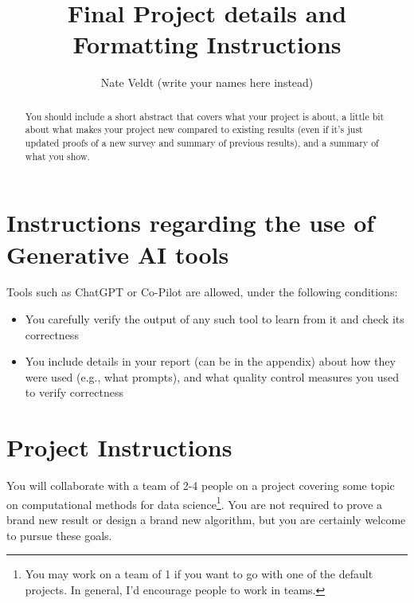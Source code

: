 \documentclass{article}
\title{Final Project details and Formatting Instructions}
\author{%
Nate Veldt (write your names here instead)
}
\begin{document}
	
	\maketitle
	
	\begin{abstract}
		You should include a short abstract that covers what your project is about, a little bit about what makes your project new compared to existing results (even if it's just updated proofs of a new survey and summary of previous results), and a summary of what you show.
	\end{abstract}

	\section{Instructions regarding the use of Generative AI tools}
	Tools such as ChatGPT or Co-Pilot are allowed, under the following conditions:
	\begin{itemize}
		\item You carefully verify the output of any such tool to learn from it and check its correctness
		\item You include details in your report (can be in the appendix) about how they were used (e.g., what prompts), and what quality control measures you used to verify correctness 
	\end{itemize}
	


	
%	
	\section{Project Instructions}
	You will collaborate with a team of 2-4 people on a project covering some topic on computational methods for data science\footnote{You may work on a team of 1 if you want to go with one of the default projects. In general, I'd encourage people to work in teams.}. You are not required to prove a brand new result or design a brand new algorithm, but you are certainly welcome to pursue these goals. 
	
\end{document}
